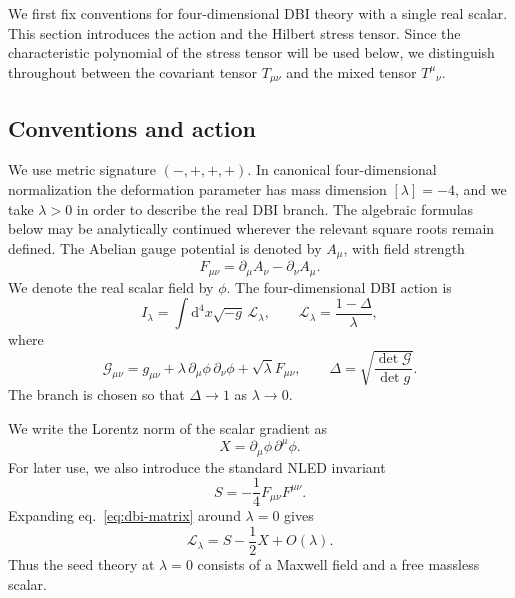 \documentclass[a4paper,11pt]{article}
\numberwithin{equation}{section}
\newcommand{\dd}{\mathrm d}
\newcommand{\Lag}{\mathcal L}
\newcommand{\G}{\mathcal G}
\begin{document}
We first fix conventions for four-dimensional DBI theory with a single real scalar. This section introduces the action and the Hilbert stress tensor. Since the characteristic polynomial of the stress tensor will be used below, we distinguish throughout between the covariant tensor $T_{\mu\nu}$ and the mixed tensor $T^\mu{}_{\nu}$.

\subsection{Conventions and action}

We use metric signature $(-,+,+,+)$. In canonical four-dimensional normalization the deformation parameter has mass dimension $[\lambda]=-4$, and we take $\lambda>0$ in order to describe the real DBI branch. The algebraic formulas below may be analytically continued wherever the relevant square roots remain defined. The Abelian gauge potential is denoted by $A_\mu$, with field strength
\begin{equation}
 F_{\mu\nu}=\partial_\mu A_\nu-\partial_\nu A_\mu.
 \label{eq:F-definition}
\end{equation}
We denote the real scalar field by $\phi$. The four-dimensional DBI action is
\begin{equation}
 I_\lambda=\int\dd^4x\sqrt{-g}\,\Lag_\lambda,
 \qquad
 \Lag_\lambda=\frac{1-\Delta}{\lambda},
 \label{eq:action}
\end{equation}
where
\begin{equation}
 \G_{\mu\nu}
 =g_{\mu\nu}+\lambda\,\partial_\mu\phi\,\partial_\nu\phi
 +\sqrt\lambda F_{\mu\nu},
 \qquad
 \Delta=\sqrt{\frac{\det\G}{\det g}}.
 \label{eq:dbi-matrix}
\end{equation}
The branch is chosen so that $\Delta\to1$ as $\lambda\to0$.

We write the Lorentz norm of the scalar gradient as
\begin{equation}
 X=\partial_\mu\phi\,\partial^\mu\phi.
 \label{eq:X-definition}
\end{equation}
For later use, we also introduce the standard NLED invariant
\begin{equation}
 S=-\frac14F_{\mu\nu}F^{\mu\nu}.
 \label{eq:S-definition}
\end{equation}
Expanding eq.~\eqref{eq:dbi-matrix} around $\lambda=0$ gives
\begin{equation}
 \Lag_\lambda=S-\frac12X+O(\lambda).
 \label{eq:seed}
\end{equation}
Thus the seed theory at $\lambda=0$ consists of a Maxwell field and a free massless scalar.
\end{document}
